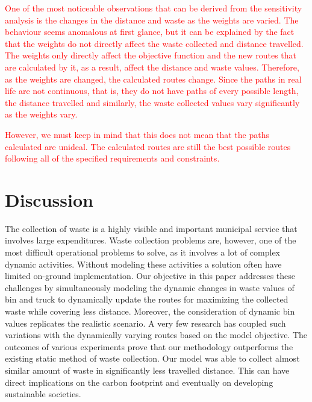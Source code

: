 \documentclass[12pt]{article}
\begin{document}
\textcolor{red}{One of the most noticeable observations that can be derived from the sensitivity analysis is the changes in the distance and waste as the weights are varied. The behaviour seems anomalous at first glance, but it can be explained by the fact that the weights do not directly affect the waste collected and distance travelled. The weights only directly affect the objective function and the new routes that are calculated by it, as a result, affect the distance and waste values. Therefore, as the weights are changed, the calculated routes change. Since the paths in real life are not continuous, that is, they do not have paths of every possible length, the distance travelled and similarly, the waste collected values vary significantly as the weights vary.} 

\textcolor{red}{However, we must keep in mind that this does not mean that the paths calculated are unideal. The calculated routes are still the best possible routes following all of the specified requirements and constraints.}




\section{Discussion}

The collection of waste is a highly visible and important municipal service that involves large expenditures. Waste collection problems are, however, one of the most difficult operational problems to solve, as it involves a lot of complex dynamic activities. Without modeling these activities a solution often have limited on-ground implementation. Our objective in this paper addresses these challenges by simultaneously modeling the dynamic changes in waste values of bin and truck to dynamically update the routes for maximizing the collected waste while covering less distance. Moreover, the consideration of dynamic bin values replicates the realistic scenario. A very few research has coupled such variations with the dynamically varying routes based on the model objective. The outcomes of various experiments prove that our methodology outperforms the existing static method of waste collection. Our model was able to collect almost similar amount of waste in significantly less travelled distance. This can have direct implications on the carbon footprint and eventually on developing sustainable societies.
\end{document}
